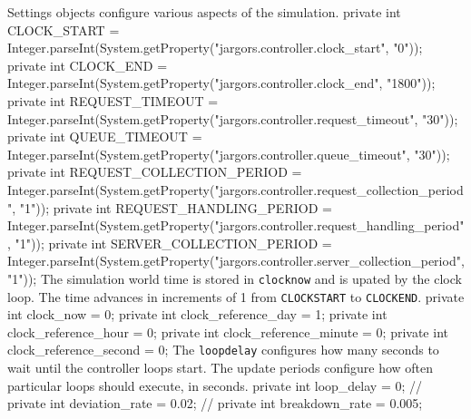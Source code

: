  Settings objects configure various aspects of the simulation.
\nwenddocs{}\endmoddef{}
private int CLOCK_START =
    Integer.parseInt(System.getProperty("jargors.controller.clock_start", "0"));
private int CLOCK_END =
    Integer.parseInt(System.getProperty("jargors.controller.clock_end", "1800"));
private int REQUEST_TIMEOUT =
    Integer.parseInt(System.getProperty("jargors.controller.request_timeout", "30"));
private int QUEUE_TIMEOUT =
    Integer.parseInt(System.getProperty("jargors.controller.queue_timeout", "30"));
private int REQUEST_COLLECTION_PERIOD =
    Integer.parseInt(System.getProperty("jargors.controller.request_collection_period", "1"));
private int REQUEST_HANDLING_PERIOD =
    Integer.parseInt(System.getProperty("jargors.controller.request_handling_period", "1"));
private int SERVER_COLLECTION_PERIOD =
    Integer.parseInt(System.getProperty("jargors.controller.server_collection_period", "1"));
\nwendcode{}\nwdocspar
The simulation world time is stored in {\tt{}clock{}now} and is upated by the
clock loop. The time advances in increments of 1 from {\tt{}CLOCK{}START}
to {\tt{}CLOCK{}END}.
\nwenddocs{}\plusendmoddef
private int clock_now = 0;
private int clock_reference_day = 1;
private int clock_reference_hour = 0;
private int clock_reference_minute = 0;
private int clock_reference_second = 0;
\nwendcode{}\nwdocspar
The {\tt{}loop{}delay} configures how many seconds to wait until the controller
loops start. The update periods configure how often particular loops should
execute, in seconds.
\nwenddocs{}\plusendmoddef
private int loop_delay = 0;
// private int deviation_rate = 0.02;
// private int breakdown_rate = 0.005;
\nwendcode{}\nwdocspar
